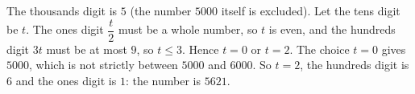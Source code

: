 The thousands digit is $5$ (the number $5000$ itself is excluded). Let the tens digit be $t$. The ones digit $\dfrac {t}{2}$ must be a whole number, so $t$ is even, and the hundreds digit $3t$ must be at most $9$, so $t\le3$. Hence $t=0$ or $t=2$. The choice $t=0$ gives $5000$, which is not strictly between $5000$ and $6000$. So $t=2$, the hundreds digit is $6$ and the ones digit is $1$: the number is $\boxed{5621}$.
